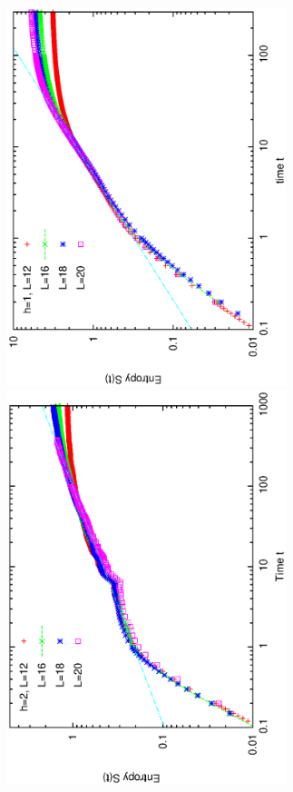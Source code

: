 \documentclass[prl,aps,epsf,showpacs,twocolumn,letterpaper]{revtex4}
\begin{document}
\begin{figure}[b]
  \includegraphics[angle=-90,width=3.2in]{newfig1c.ps}\\
  \vspace{-0.10in}
  \includegraphics[angle=-90,width=3.2in]{newfig1d.ps}\\
  \hspace{0.0in}
  \vspace{-0.3in}

\end{figure}
\end{document}
